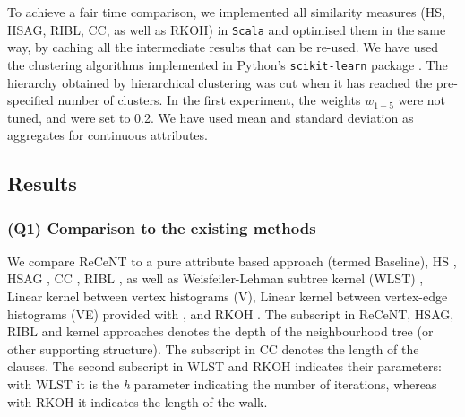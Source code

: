 To achieve a fair time comparison, we implemented all similarity measures (HS, HSAG, RIBL, CC, as well as RKOH) in \texttt{Scala} and optimised them in the same way, by caching all the intermediate results that can be re-used.
We have used the clustering algorithms implemented in Python's \texttt{scikit-learn} package \cite{scikit-learn}.
The hierarchy obtained by hierarchical clustering was cut when it has reached the pre-specified number of clusters.
In the first experiment, the weights $w_{1-5}$ were not tuned, and were set to 0.2.
We have used mean and standard deviation as aggregates for continuous attributes.






\subsection{Results}
\label{sec:ResultsSub}



\subsubsection{\textbf{(Q1) Comparison to the existing methods}}

We compare ReCeNT to a pure attribute based approach (termed Baseline), HS \cite{Neville03clusteringrelational}, HSAG \cite{WitsenburgB11a}, CC \cite{Fonseca2012}, RIBL \cite{RIBL96}, as well as Weisfeiler-Lehman subtree kernel (WLST) \cite{shervashidze09fastsubtree}, Linear kernel between vertex histograms (V), Linear kernel between vertex-edge histograms (VE) provided with \cite{NIPS2015_5688}, and RKOH \cite{WachmanK07}.
The subscript in ReCeNT, HSAG, RIBL and kernel approaches  denotes the depth of the neighbourhood tree (or other supporting structure).
The subscript in CC denotes the length of the clauses.
The second subscript in WLST and RKOH indicates their parameters: with WLST it is the \textit{h} parameter indicating the number of iterations, whereas with RKOH it indicates the length of the walk.



